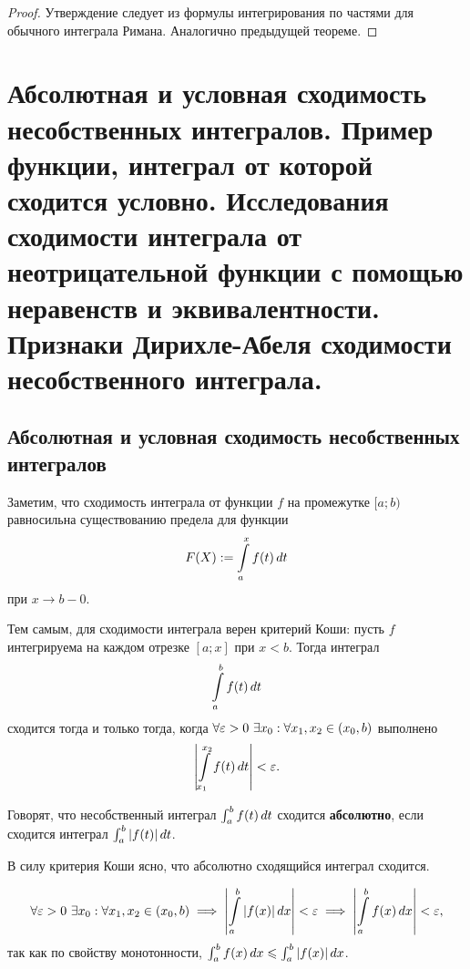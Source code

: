 \documentclass[a4paper]{article}
\theoremstyle{named}
\renewcommand{\int}{\intop}
\begin{document}
        \begin{proof}
            Утверждение следует из формулы интегрирования по частями для обычного интеграла Римана. Аналогично предыдущей теореме.
        \end{proof}

    \section{Абсолютная и условная сходимость несобственных интегралов. Пример функции, интеграл от которой сходится условно. Исследования сходимости интеграла от неотрицательной функции с помощью неравенств и эквивалентности. Признаки Дирихле-Абеля сходимости несобственного интеграла.}

        \subsection{Абсолютная и условная сходимость несобственных интегралов}

        Заметим, что сходимость интеграла от функции $f$ на промежутке $[a; b)$ равносильна существованию предела для функции
        \begin{equation*}
            F(X) := \int_a^x f(t) \dd t
        \end{equation*}
        при $x \to b - 0$.

        Тем самым, для сходимости интеграла верен критерий Коши: пусть $f$ интегрируема на каждом отрезке $[a; x]$ при $x < b$. Тогда интеграл
        \begin{equation*}
            \int_a^b f(t) \dd t
        \end{equation*}
        сходится тогда и только тогда, когда $\forall \varepsilon > 0 \ \exists x_0: \forall x_1, x_2 \in (x_0, b)$ выполнено
        \begin{equation*}
            \left|\int_{x_1}^{x_2} f(t) \dd t\right| < \eps.
        \end{equation*}

        \begin{definition*}
            Говорят, что несобственный интеграл $\int_a^b f(t) \dd t$ сходится \textbf{абсолютно}, если сходится интеграл $\int_a^b |f(t)| \dd t$.
        \end{definition*}

        \begin{remark*}
            В силу критерия Коши ясно, что абсолютно сходящийся интеграл сходится.

            \begin{equation*}
                \forall \eps > 0 \ \exists x_0: \forall x_1, x_2 \in (x_0, b) \implies \left|\int_a^b |f(x)| \dd x\right| < \eps \implies \left|\int_a^b f(x) \dd x\right| < \eps,
            \end{equation*}
            так как по свойству монотонности, $\int_a^b f(x) \dd x \leq \int_a^b |f(x)| \dd x$.
        \end{remark*}
\end{document}
